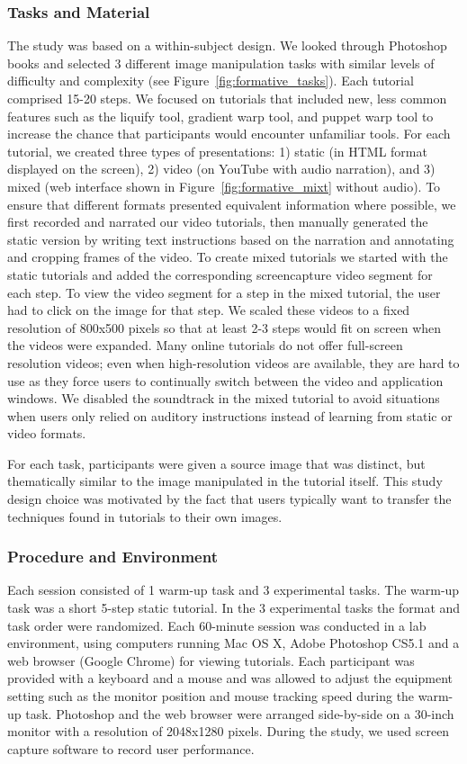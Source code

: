 \subsubsection{Tasks and Material}
The study was based on a within-subject design. We looked through Photoshop books and selected 3 different image manipulation tasks with similar levels of difficulty and complexity (see Figure~\ref{fig:formative_tasks}). Each tutorial comprised 15-20 steps. We focused on tutorials that included new, less common features such as the liquify tool, gradient warp tool, and puppet warp tool to increase the chance that participants would encounter unfamiliar tools. For each tutorial, we created three types of presentations: 1) static (in HTML format displayed on the screen), 2) video (on YouTube with audio narration), and 3) mixed (web interface shown in Figure~\ref{fig:formative_mixt} without audio). To ensure that different formats presented equivalent information where possible, we first recorded and narrated our video tutorials, then manually generated the static version by writing text instructions based on the narration and annotating and cropping frames of the video. To create mixed tutorials we started with the static tutorials and added the corresponding screencapture video segment for each step. To view the video segment for a step in the mixed tutorial, the user had to click on the image for that step. We scaled these videos to a fixed resolution of 800x500 pixels so that at least 2-3 steps would fit on screen when the videos were expanded. Many online tutorials do not offer full-screen resolution videos; even when high-resolution videos are available, they are hard to use as they force users to continually switch between the video and application windows. We disabled the soundtrack in the mixed tutorial to avoid situations when users only relied on auditory instructions instead of learning from static or video formats.

For each task, participants were given a source image that was distinct, but thematically similar to the image manipulated in the tutorial itself. This study design choice was motivated by the fact that users typically want to transfer the techniques found in tutorials to their own images.

\subsubsection{Procedure and Environment}
Each session consisted of 1 warm-up task and 3 experimental tasks. The warm-up task was a short 5-step static tutorial. In the 3 experimental tasks the format and task order were randomized. Each 60-minute session was conducted in a lab environment, using computers running Mac OS X, Adobe Photoshop CS5.1 and a web browser (Google Chrome) for viewing tutorials. Each participant was provided with a keyboard and a mouse and was allowed to adjust the equipment setting such as the monitor position and mouse tracking speed during the warm-up task. Photoshop and the web browser were arranged side-by-side on a 30-inch monitor with a resolution of 2048x1280 pixels. During the study, we used screen capture software to record user performance.

